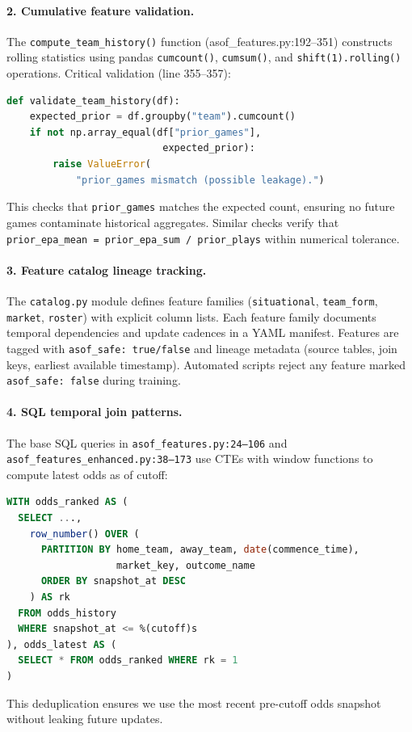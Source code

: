 \paragraph{2. Cumulative feature validation.}
The \texttt{compute\_team\_history()} function (asof\_features.py:192--351) constructs rolling statistics using pandas \texttt{cumcount()}, \texttt{cumsum()}, and \texttt{shift(1).rolling()} operations. Critical validation (line 355--357):
\begin{lstlisting}[language=Python,basicstyle=\ttfamily\scriptsize,breaklines=true,postbreak=\mbox{\textcolor{red}{$\hookrightarrow$}\space}]
def validate_team_history(df):
    expected_prior = df.groupby("team").cumcount()
    if not np.array_equal(df["prior_games"],
                           expected_prior):
        raise ValueError(
            "prior_games mismatch (possible leakage).")
\end{lstlisting}
This checks that \texttt{prior\_games} matches the expected count, ensuring no future games contaminate historical aggregates. Similar checks verify that \texttt{prior\_epa\_mean = prior\_epa\_sum / prior\_plays} within numerical tolerance.

\paragraph{3. Feature catalog lineage tracking.}
The \texttt{catalog.py} module defines feature families (\texttt{situational}, \texttt{team\_form}, \texttt{market}, \texttt{roster}) with explicit column lists. Each feature family documents temporal dependencies and update cadences in a YAML manifest. Features are tagged with \texttt{asof\_safe: true/false} and lineage metadata (source tables, join keys, earliest available timestamp). Automated scripts reject any feature marked \texttt{asof\_safe: false} during training.

\paragraph{4. SQL temporal join patterns.}
The base SQL queries in \texttt{asof\_features.py:24--106} and \texttt{asof\_features\_enhanced.py:38--173} use CTEs with window functions to compute latest odds as of cutoff:
\begin{lstlisting}[language=SQL,basicstyle=\ttfamily\footnotesize]
WITH odds_ranked AS (
  SELECT ...,
    row_number() OVER (
      PARTITION BY home_team, away_team, date(commence_time),
                   market_key, outcome_name
      ORDER BY snapshot_at DESC
    ) AS rk
  FROM odds_history
  WHERE snapshot_at <= %(cutoff)s
), odds_latest AS (
  SELECT * FROM odds_ranked WHERE rk = 1
)
\end{lstlisting}
This deduplication ensures we use the most recent pre-cutoff odds snapshot without leaking future updates.

